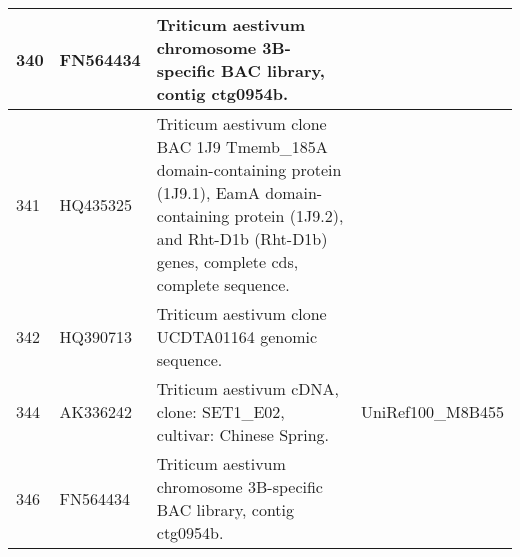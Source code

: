 {\begin{longtable}{|p{1.5cm}|p{2cm}|p{9cm}|p{3cm}|}
340 & FN564434 & Triticum aestivum chromosome 3B-specific BAC library, contig ctg0954b. & \\
\hline
341 & HQ435325 & Triticum aestivum clone BAC 1J9 Tmemb\_185A domain-containing protein (1J9.1), EamA domain-containing protein (1J9.2), and Rht-D1b (Rht-D1b) genes, complete cds, complete sequence. & \\
\hline
342 & HQ390713 & Triticum aestivum clone UCDTA01164 genomic sequence. & \\
\hline
344 & AK336242 & Triticum aestivum cDNA, clone: SET1\_E02, cultivar: Chinese Spring. & UniRef100\_M8B455\\
\hline
346 & FN564434 & Triticum aestivum chromosome 3B-specific BAC library, contig ctg0954b. & \\
\hline
\end{longtable}
}
